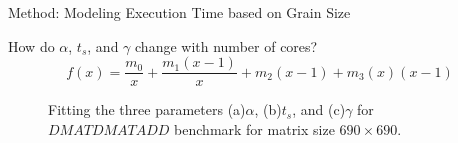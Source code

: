 \documentclass[10pt]{beamer}
\begin{document}
\begin{frame}{Method: Modeling Execution Time based on Grain Size}
	\begin{outline}	
	\1How do $\alpha$, $t_s$, and $\gamma$ change with number of cores?
		$$f(x)=\frac{m_0}{x}+\frac{m_1(x-1)}{x}+m_2(x-1)+m_3(x)(x-1)$$
	\begin{figure}[H]
		\centering
		\hfill	
		\caption{Fitting the three parameters (a)$\alpha$, (b)$t_s$, and (c)$\gamma$ for $DMATDMATADD$ benchmark for matrix size $690\times690$.}	
		\label{fig24}
	\end{figure}
\end{outline}
\end{frame}
\end{document}
